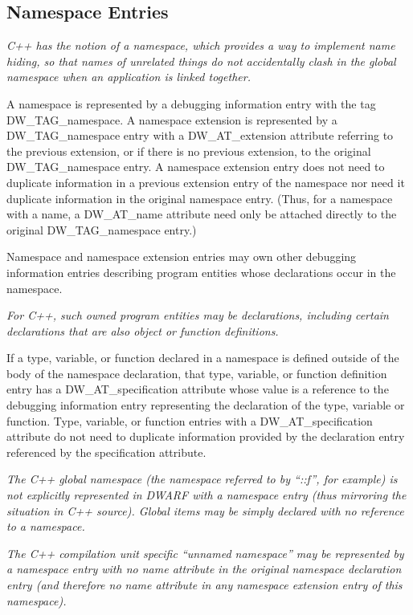 \subsection{Namespace Entries}
\label{chap:namespaceentries}
\textit{C++ has the notion of a namespace, which provides a way to
implement name hiding, so that names of unrelated things
do not accidentally clash in the global namespace when an
application is linked together.}

A namespace is represented by a debugging information entry
with the tag DW\-\_TAG\-\_namespace. A namespace extension is
represented by a DW\-\_TAG\-\_namespace entry with a DW\-\_AT\-\_extension
attribute referring to the previous extension, or if there
is no previous extension, to the original DW\-\_TAG\-\_namespace
entry. A namespace extension entry does not need to duplicate
information in a previous extension entry of the namespace
nor need it duplicate information in the original namespace
entry. (Thus, for a namespace with a name, a DW\_AT\_name
attribute need only be attached directly to the original
DW\-\_TAG\-\_namespace entry.)

Namespace and namespace extension entries may own other
debugging information entries describing program entities
whose declarations occur in the namespace.

\textit{For C++, such owned program entities may be declarations,
including certain declarations that are also object or
function definitions.}

If a type, variable, or function declared in a namespace is
defined outside of the body of the namespace declaration,
that type, variable, or function definition entry has a
DW\-\_AT\-\_specification attribute whose value is a reference to the
debugging information entry representing the declaration of
the type, variable or function. Type, variable, or function
entries with a DW\-\_AT\-\_specification attribute do not need
to duplicate information provided by the declaration entry
referenced by the specification attribute.

\textit{The C++ global namespace (the namespace referred to by
``::f'', for example) is not explicitly represented in
DWARF with a namespace entry (thus mirroring the situation
in C++ source).  Global items may be simply declared with no
reference to a namespace.}

\textit{The C++ compilation unit specific ``unnamed namespace'' may
be represented by a namespace entry with no name attribute in
the original namespace declaration entry (and therefore no name
attribute in any namespace extension entry of this namespace).
}

